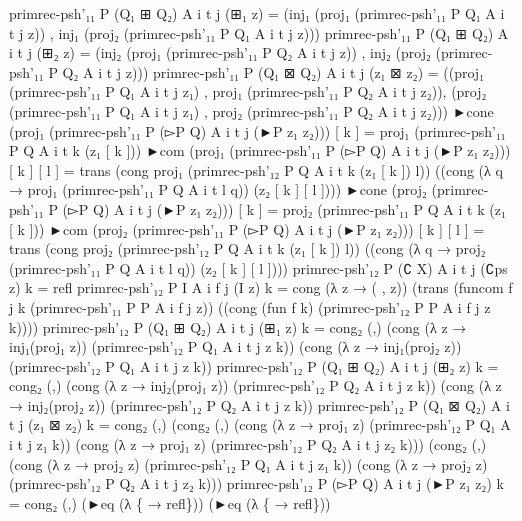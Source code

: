 {\begin{code}
{primrec{-}psh'₁₁ P (Q₁ ⊞ Q₂) A i t j (⊞₁ z) = (inj₁ (proj₁ (primrec{-}psh'₁₁ P Q₁ A i t j z)) , inj₁ (proj₂ (primrec{-}psh'₁₁ P Q₁ A i t j z)))
primrec{-}psh'₁₁ P (Q₁ ⊞ Q₂) A i t j (⊞₂ z) = (inj₂ (proj₁ (primrec{-}psh'₁₁ P Q₂ A i t j z)) , inj₂ (proj₂ (primrec{-}psh'₁₁ P Q₂ A i t j z)))
primrec{-}psh'₁₁ P (Q₁ ⊠ Q₂) A i t j (z₁ ⊠ z₂) =
  ((proj₁ (primrec{-}psh'₁₁ P Q₁ A i t j z₁) , proj₁ (primrec{-}psh'₁₁ P Q₂ A i t j z₂)),
   (proj₂ (primrec{-}psh'₁₁ P Q₁ A i t j z₁) , proj₂ (primrec{-}psh'₁₁ P Q₂ A i t j z₂)))
►cone (proj₁ (primrec{-}psh'₁₁ P (▻P Q) A i t j (►P z₁ z₂))) [ k ] = proj₁ (primrec{-}psh'₁₁ P Q A i t k (z₁ [ k ]))
►com (proj₁ (primrec{-}psh'₁₁ P (▻P Q) A i t j (►P z₁ z₂))) [ k ] [ l ] =
  trans (cong proj₁ (primrec{-}psh'₁₂ P Q A i t k (z₁ [ k ]) l))
        ((cong (λ q → proj₁ (primrec{-}psh'₁₁ P Q A i t l q)) (z₂ [ k ] [ l ])))
►cone (proj₂ (primrec{-}psh'₁₁ P (▻P Q) A i t j (►P z₁ z₂))) [ k ] = proj₂ (primrec{-}psh'₁₁ P Q A i t k (z₁ [ k ]))
►com (proj₂ (primrec{-}psh'₁₁ P (▻P Q) A i t j (►P z₁ z₂))) [ k ] [ l ] =
  trans (cong proj₂ (primrec{-}psh'₁₂ P Q A i t k (z₁ [ k ]) l))
        ((cong (λ q → proj₂ (primrec{-}psh'₁₁ P Q A i t l q)) (z₂ [ k ] [ l ])))
primrec{-}psh'₁₂ P (∁ X) A i t j (∁ps z) k = refl
primrec{-}psh'₁₂ P I A i f j (I z) k =
  cong (λ z → (\AgdaUnderscore{} , z))
       (trans (funcom f j k (primrec{-}psh'₁₁ P P A i f j z))
              ((cong (fun f k) (primrec{-}psh'₁₂ P P A i f j z k))))
primrec{-}psh'₁₂ P (Q₁ ⊞ Q₂) A i t j (⊞₁ z) k =
  cong₂ (\AgdaUnderscore{},\AgdaUnderscore{})
        (cong (λ z → inj₁(proj₁ z)) (primrec{-}psh'₁₂ P Q₁ A i t j z k))
        (cong (λ z → inj₁(proj₂ z)) (primrec{-}psh'₁₂ P Q₁ A i t j z k))
primrec{-}psh'₁₂ P (Q₁ ⊞ Q₂) A i t j (⊞₂ z) k =
  cong₂ (\AgdaUnderscore{},\AgdaUnderscore{})
        (cong (λ z → inj₂(proj₁ z)) (primrec{-}psh'₁₂ P Q₂ A i t j z k))
        (cong (λ z → inj₂(proj₂ z)) (primrec{-}psh'₁₂ P Q₂ A i t j z k))
primrec{-}psh'₁₂ P (Q₁ ⊠ Q₂) A i t j (z₁ ⊠ z₂) k =
  cong₂ (\AgdaUnderscore{},\AgdaUnderscore{})
        (cong₂ (\AgdaUnderscore{},\AgdaUnderscore{})
               (cong (λ z → proj₁ z) (primrec{-}psh'₁₂ P Q₁ A i t j z₁ k))
               (cong (λ z → proj₁ z) (primrec{-}psh'₁₂ P Q₂ A i t j z₂ k)))
        (cong₂ (\AgdaUnderscore{},\AgdaUnderscore{})
               (cong (λ z → proj₂ z) (primrec{-}psh'₁₂ P Q₁ A i t j z₁ k))
               (cong (λ z → proj₂ z) (primrec{-}psh'₁₂ P Q₂ A i t j z₂ k)))
primrec{-}psh'₁₂ P (▻P Q) A i t j (►P z₁ z₂) k = cong₂ (\AgdaUnderscore{},\AgdaUnderscore{}) (►eq (λ \{\AgdaUnderscore{} → refl\})) (►eq (λ \{\AgdaUnderscore{} → refl\}))

}
\end{code}}
